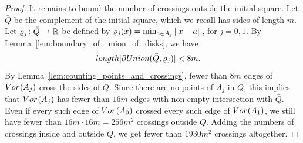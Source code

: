 \documentclass[10pt,a4paper]{amsart}
\newcommand{\Edist}[2]      {\mm{\|{#1}-{#2}\|}}
\newcommand{\Rspace}        {\mm{{\mathbb R}}}
\newcommand{\Union}[2]      {\mm{\rm Union}{({#1},{#2})}}
\newcommand{\Voronoi}[2]    {\mm{{\rm Vor}_{#1}{({#2})}}}
\newcommand{\length}[1]     {\mm{\rm length}{[{#1}]}}
\newcommand {\mm}[1]   {\ifmmode{#1}\else{\mbox{\(#1\)}}\fi}
\begin{document}
\begin{proof}
  \medskip
  It remains to bound the number of crossings outside the initial square.
  Let $\bar{Q}$ be the complement of the initial square, which we recall has sides of length $m$.
  Let $\varrho_j \colon \bar{Q} \to \Rspace$ be defined by $\varrho_j (x) = \min_{a \in A_j} \Edist{x}{a}$, for $j = 0, 1$.
  By Lemma~\ref{lem:boundary_of_union_of_disks}, we have
  \begin{align}
    \length{\partial \Union{\bar{Q}}{\varrho_j}}  &<  8m .
  \end{align}
  By Lemma~\ref{lem:counting_points_and_crossings}, fewer than $8m$ edges of $\Voronoi{}{A_j}$ cross the sides of $\bar{Q}$.
  Since there are no points of $A_j$ in $\bar{Q}$,
  this implies that $\Voronoi{}{A_j}$ has fewer than $16 m$ edges with non-empty intersection with $\bar{Q}$.
  Even if every such edge of $\Voronoi{}{A_0}$ crossed every such edge of $\Voronoi{}{A_1}$, we still have fewer than $16 m \cdot 16 m = 256 m^2$ crossings outside $Q$.
  Adding the numbers of crossings inside and outside $Q$, we get fewer than $1930 m^2$ crossings altogether.
\end{proof}
\end{document}
